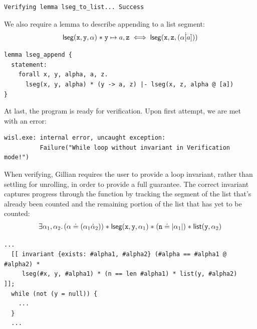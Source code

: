 \begin{lstlisting}[style=code, numbers=none, caption={List lemma in WISL - Gillian output}]
Verifying lemma lseg_to_list... Success
\end{lstlisting}

We also require a lemma to describe appending to a list segment:
\begin{align*}
    \mathsf{lseg}(\mathtt{x}, \mathtt{y}, \alpha) \mathrel{*} \mathtt{y} \mapsto a, \mathtt{z} \iff \mathsf{lseg}(\mathtt{x}, \mathtt{z}, (\alpha \dot [a]))
\end{align*}

\begin{lstlisting}[style=code, numbers=none, caption={List segment lemma in WISL}]
lemma lseg_append {
  statement:
    forall x, y, alpha, a, z.
      lseg(x, y, alpha) * (y -> a, z) |- lseg(x, z, alpha @ [a])
}
\end{lstlisting}

At last, the program is ready for verification. Upon first attempt, we are met with an error:
\begin{lstlisting}[style=code, numbers=none, caption={Attempted verification - no loop invariant}]
wisl.exe: internal error, uncaught exception:
          Failure("While loop without invariant in Verification mode!")
\end{lstlisting}

When verifying, Gillian requires the user to provide a loop invariant, rather
than settling for unrolling, in order to provide a full guarantee. The correct
invariant captures progress through the function by tracking the segment of the
list that's already been counted and the remaining portion of the list that has
yet to be counted:
\begin{align*}
    \exists \alpha_1, \alpha_2 \ldotp (\alpha \doteq (\alpha_1 \dot \alpha_2)) \mathrel{*} \mathsf{lseg}(\mathtt{x}, \mathtt{y}, \alpha_1) \mathrel{*} (\mathtt{n} \doteq | \alpha_1 |) \mathrel{*} \mathsf{list}(\mathtt{y}, \alpha_2)
\end{align*}

\begin{lstlisting}[style=code, numbers=none, caption={WISL list length - loop invariant}]
  ...
  [[ invariant {exists: #alpha1, #alpha2} (#alpha == #alpha1 @ #alpha2) * 
     lseg(#x, y, #alpha1) * (n == len #alpha1) * list(y, #alpha2)         ]];
  while (not (y = null)) {
    ...
  }
  ...
\end{lstlisting}

